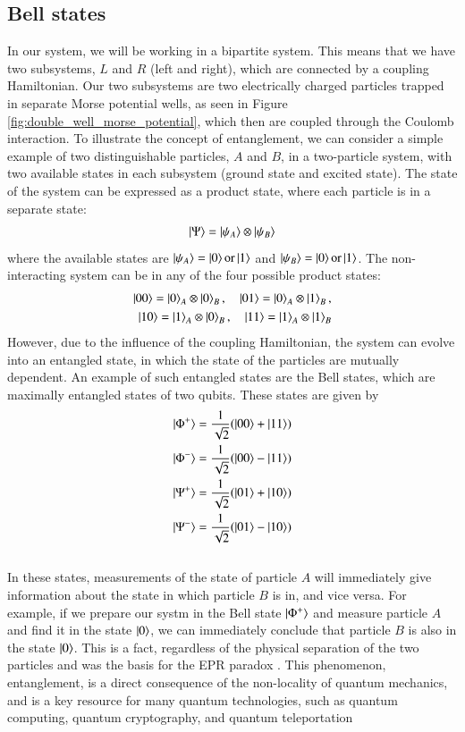 \documentclass{subfiles}
\begin{document}
\subsection{Bell states}
In our system, we will be working in a bipartite system. This means that we have two subsystems, $L$ and $R$ (left and right), which are connected by a coupling Hamiltonian. Our two subsystems are two electrically charged particles trapped in separate Morse potential wells, as seen in Figure \eqref{fig:double_well_morse_potential}, which then are coupled through the Coulomb interaction. 
To illustrate the concept of entanglement, we can consider a simple example of two distinguishable particles, $A$ and $B$, in a two-particle system, with two available states in each subsystem (ground state and excited state). The state of the system can be expressed as a product state, where each particle is in a separate state:
\begin{align*}
    \ket{\Psi} = \ket{\psi_A}\otimes\ket{\psi_B}
\end{align*}
where the available states are $\ket{\psi_A} = \ket{0} \text{or} \ket{1}$ and $\ket{\psi_B} = \ket{0} \text{or} \ket{1}$. The non-interacting system can be in any of the four possible product states: 
\begin{align*}
    \ket{00} = \ket{0}_A\otimes\ket{0}_B, \quad \ket{01} = \ket{0}_A\otimes\ket{1}_B, \\
    \ket{10} = \ket{1}_A\otimes\ket{0}_B, \quad \ket{11} = \ket{1}_A\otimes\ket{1}_B
\end{align*}
However, due to the influence of the coupling Hamiltonian, the system can evolve into an entangled state, in which the state of the particles are mutually dependent. An example of such entangled states are the Bell states, which are maximally entangled states of two qubits. These states are given by
\begin{align*}
    \ket{\Phi^+} &= \frac{1}{\sqrt{2}}(\ket{00} + \ket{11}) \\
    \ket{\Phi^-} &= \frac{1}{\sqrt{2}}(\ket{00} - \ket{11}) \\
    \ket{\Psi^+} &= \frac{1}{\sqrt{2}}(\ket{01} + \ket{10}) \\
    \ket{\Psi^-} &= \frac{1}{\sqrt{2}}(\ket{01} - \ket{10})
\end{align*}
\\ 
In these states, measurements of the state of particle $A$ will immediately give information about the state in which particle $B$ is in, and vice versa. For example, if we prepare our systm in the Bell state $\ket{\Phi^+}$ and measure particle $A$ and find it in the state $\ket{0}$, we can immediately conclude that particle $B$ is also in the state $\ket{0}$. This is a fact, regardless of the physical separation of the two particles and was the basis for the EPR paradox \cite{EPR_1935}. This phenomenon, entanglement, is a direct consequence of the non-locality of quantum mechanics, and is a key resource for many quantum technologies, such as quantum computing, quantum cryptography, and quantum teleportation \cite{bouwmeester1997experimental, gisin2002quantum, nielsen2010quantum}\\ 
\end{document}

